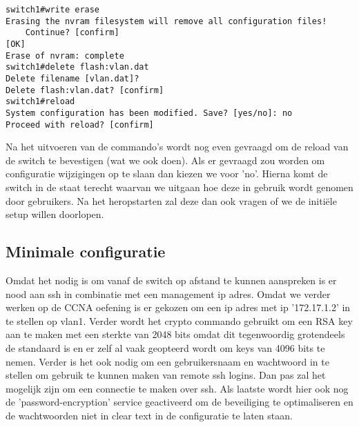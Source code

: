 \begin{center}
\begin{verbatim}
switch1#write erase
Erasing the nvram filesystem will remove all configuration files! 
    Continue? [confirm]
[OK]
Erase of nvram: complete
switch1#delete flash:vlan.dat 
Delete filename [vlan.dat]? 
Delete flash:vlan.dat? [confirm]
switch1#reload
System configuration has been modified. Save? [yes/no]: no
Proceed with reload? [confirm]
\end{verbatim}
\end{center}

Na het uitvoeren van de commando's wordt nog even gevraagd om de reload van de switch te bevestigen (wat we ook doen). Als er gevraagd zou worden om configuratie wijzigingen op te slaan dan kiezen we voor 'no'. Hierna komt de switch in de staat terecht waarvan we uitgaan hoe deze in gebruik wordt genomen door gebruikers. Na het heropstarten zal deze dan ook vragen of we de initiële setup willen doorlopen. 

\subsection{Minimale configuratie}
\label{sec:minimale configuratie}
Omdat het nodig is om vanaf de switch op afstand te kunnen aanspreken is er nood aan ssh in combinatie met een management ip adres. Omdat we verder werken op de CCNA oefening is er gekozen om een ip adres met ip '172.17.1.2' in te stellen op vlan1. Verder wordt het crypto commando gebruikt om een RSA key aan te maken met een sterkte van 2048 bits omdat dit tegenwoordig grotendeels de standaard is en er zelf al vaak geopteerd wordt om keys van 4096 bits te nemen.
Verder is het ook nodig om een gebruikersnaam en wachtwoord in te stellen om gebruik te kunnen maken van remote ssh logins. Dan pas zal het mogelijk zijn om een connectie te maken over ssh. Als laatste wordt hier ook nog de 'password-encryption' service geactiveerd om de beveiliging te optimaliseren en de wachtwoorden niet in clear text in de configuratie te laten staan.

